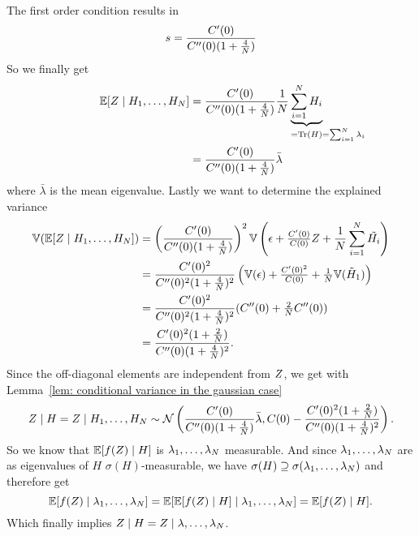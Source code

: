The first order condition results in
\[
	s = \frac{C'(0)}{C''(0)(1+\tfrac4{N})}
\]
So we finally get
\begin{align*}
	\E[\rf\mid H_1,\dots,H_\dimension]
	&= \frac{\sqC'(0)}{\sqC''(0)(1+\tfrac4{\dimension})}
	\frac1\dimension\underbrace{\sum_{i=1}^\dimension H_i}_{
		=\trace(H) \mathrlap{=\sum_{i=1}^\dimension\lambda_i}
	}\\
	&= \frac{\sqC'(0)}{\sqC''(0)(1+\tfrac4{\dimension})}
	\bar{\lambda}
\end{align*}
where \(\bar{\lambda}\) is the mean eigenvalue. Lastly we want to determine
the explained variance
\begin{align*}
	\mathbb{V}(\mathbb{E}[Z\mid H_1,\dots,H_N])
	&= \left(\frac{C'(0)}{C''(0)(1+\tfrac4{N})}\right)^2
	\mathbb{V}\left(
		\epsilon + \tfrac{C'(0)}{C(0)}Z + \frac{1}{N}\sum_{i=1}^N \tilde{H_i}
	\right)\\
	&= \frac{C'(0)^2}{C''(0)^2(1+\tfrac4{N})^2}
	\left(
		\mathbb{V}(\epsilon) + \tfrac{C'(0)^2}{C(0)} + \tfrac1{N}\mathbb{V}(\tilde{H}_1)
	\right)\\
	&= \frac{C'(0)^2}{C''(0)^2(1+\tfrac4{N})^2}
	(C''(0) + \tfrac2{N}C''(0))\\
	&= \frac{C'(0)^2(1+\tfrac2{N})}{C''(0)(1+\tfrac4{N})^2}.
\end{align*}
Since the off-diagonal elements are independent from \(Z\), we get with
Lemma~\ref{lem: conditional variance in the gaussian case}
\[
	Z\mid H = Z \mid H_1,\dots, H_N \sim \mathcal{N}\left(
		\frac{C'(0)}{C''(0)(1+\tfrac4{N})}\bar{\lambda},
		C(0)-\frac{C'(0)^2(1+\tfrac2{N})}{C''(0)(1+\tfrac4{N})^2}
	\right).
\]
So we know that \(\mathbb{E}[f(Z)\mid H]\) is \(\lambda_1,\dots,\lambda_N\)
measurable. And since \(\lambda_1,\dots,\lambda_N\) are as eigenvalues
of \(H\) \(\sigma(H)\)-measurable, we have \(\sigma(H)\supseteq \sigma(\lambda_1,\dots,\lambda_N)\)
and therefore get
\[
	\mathbb{E}[f(Z)\mid \lambda_1,\dots,\lambda_N]
	= \mathbb{E}[\mathbb{E}[f(Z)\mid H] \mid \lambda_1,\dots,\lambda_N]
	= \mathbb{E}[f(Z)\mid H].
\]
Which finally implies \(Z\mid H = Z\mid \lambda,\dots,\lambda_N\).